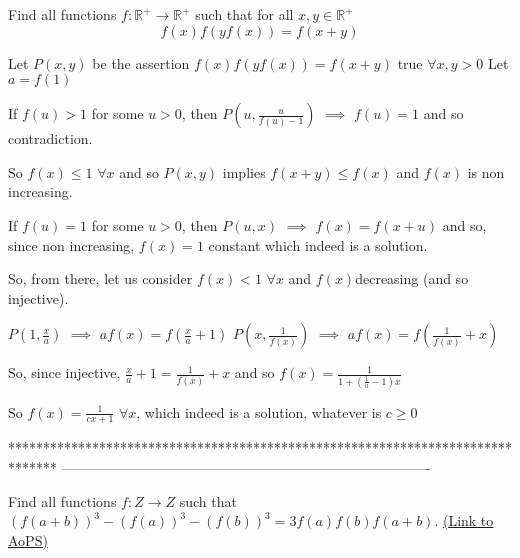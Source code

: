 \begin{solution}
	\begin{tcolorbox}Find all functions $f:\mathbb{R}^+\to \mathbb{R}^+$ such that for all $x,y\in\mathbb{R}^+$\[f(x)f(yf(x))=f(x+y)\]\end{tcolorbox}
Let $P(x,y)$ be the assertion $f(x)f(yf(x))=f(x+y)$ true $\forall x,y>0$
Let $a=f(1)$

If $f(u)>1$ for some $u>0$, then $P(u,\frac u{f(u)-1})$ $\implies$ $f(u)=1$ and so contradiction.

So $f(x)\le 1$ $\forall x$ and so $P(x,y)$ implies $f(x+y)\le f(x)$ and $f(x)$ is non increasing.

If $f(u)=1$ for some $u>0$, then $P(u,x)$ $\implies$ $f(x)=f(x+u)$ and so, since non increasing, $\boxed{f(x)=1}$ constant which indeed is a solution.

So, from there, let us consider $f(x)<1$ $\forall x$ and $f(x)$decreasing (and so injective).

$P(1,\frac xa)$ $\implies$ $af(x)=f(\frac xa+1)$ 
$P(x,\frac 1{f(x)})$ $\implies$ $af(x)=f(\frac 1{f(x)}+x)$ 

So, since injective, $\frac xa+1=\frac 1{f(x)}+x$ and so $f(x)=\frac 1{1+(\frac 1a-1)x}$

So $\boxed{f(x)=\frac 1{cx+1}}$ $\forall x$, which indeed is a solution, whatever is $c\ge 0$
\end{solution}
*******************************************************************************
-------------------------------------------------------------------------------

\begin{problem}
	Find all  functions $f:Z \rightarrow Z$  such that $(f(a+b))^3-(f(a))^3-(f(b))^3=3f(a)f(b)f(a+b)$.
	\flushright \href{https://artofproblemsolving.com/community/c6h562704}{(Link to AoPS)}
\end{problem}



